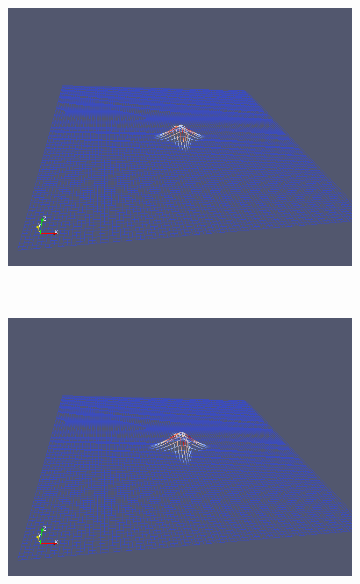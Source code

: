 \begin{figure}[H]
\begin{subfigure}[t]{0.5\textwidth}
        \centering
        \includegraphics[width=\textwidth]{img/fiber/density_1_radius_1_amplitude_0.1/3.png}
    \end{subfigure}%
    ~
    \begin{subfigure}[t]{0.5\textwidth}
        \centering
        \includegraphics[width=\textwidth]{img/fiber/density_1_radius_1_amplitude_0.1/4.png}
    \end{subfigure}
    ~
    \begin{subfigure}[t]{0.5\textwidth}
        \centering

\end{subfigure}
\end{figure}
